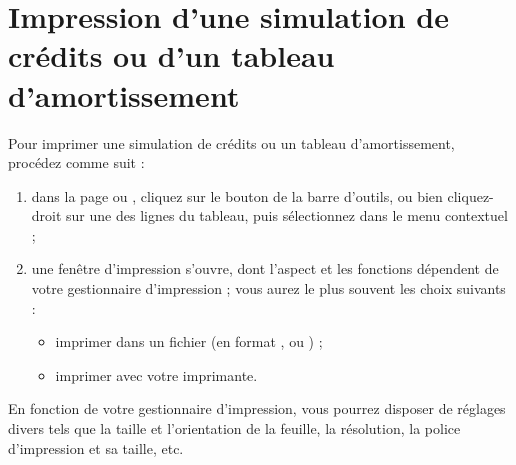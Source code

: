 \section{Impression d'une simulation de crédits ou d'un tableau d'amortissement\label{credit-print}}


Pour imprimer une simulation de crédits ou un tableau d'amortissement, procédez comme suit :

\begin{enumerate}
	 \item dans la page  ou , cliquez sur le bouton  de la barre d'outils, ou bien cliquez-droit sur une des lignes du tableau, puis sélectionnez  dans le menu contextuel ;
	 \item  une fenêtre d'impression s'ouvre, dont l'aspect et les fonctions dépendent de votre gestionnaire d'impression ; vous aurez le plus souvent les choix suivants :
		  \begin{itemize}
			  \item imprimer dans un fichier (en format ,  ou ) ; 
			  \item imprimer avec votre imprimante.
		  \end{itemize}
\end{enumerate}

En fonction de votre gestionnaire d'impression, vous pourrez disposer de réglages divers tels que la taille et l'orientation de la feuille, la résolution, la police d'impression et sa taille, etc.

